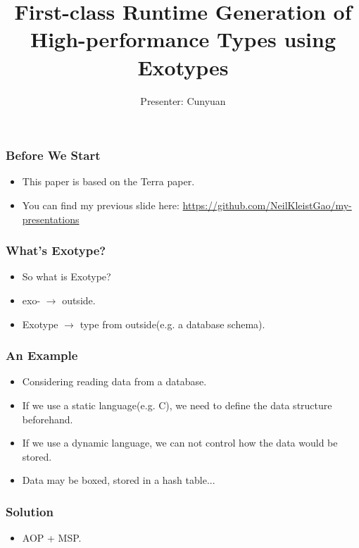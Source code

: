 \documentclass{beamer}
\begin{document}
\title{First-class Runtime Generation of High-performance Types using Exotypes}
\author{Presenter: Cunyuan}
\maketitle

\begin{frame}
	\frametitle{Before We Start}
  \begin{itemize}
  \item This paper is based on the Terra paper.\pause
  \item You can find my previous slide here: \url{https://github.com/NeilKleistGao/my-presentations}
  \end{itemize}
\end{frame}

\begin{frame}
	\frametitle{What's Exotype?}
  \begin{itemize}
  \item So what is Exotype?\pause
  \item exo- $\rightarrow$ outside.\pause
  \item Exotype $\rightarrow$ type from outside(e.g. a database schema).
  \end{itemize}
\end{frame}

\begin{frame}
	\frametitle{An Example}
  \begin{itemize}
  \item Considering reading data from a database.\pause
  \item If we use a static language(e.g. C), we need to define the data structure beforehand.\pause
  \item If we use a dynamic language, we can not control how the data would be stored.\pause
  \item Data may be boxed, stored in a hash table...
  \end{itemize}
\end{frame}

\begin{frame}
	\frametitle{Solution}
  \begin{itemize}
  \item AOP + MSP.\pause
  \end{itemize}
\end{frame}
\end{document}
